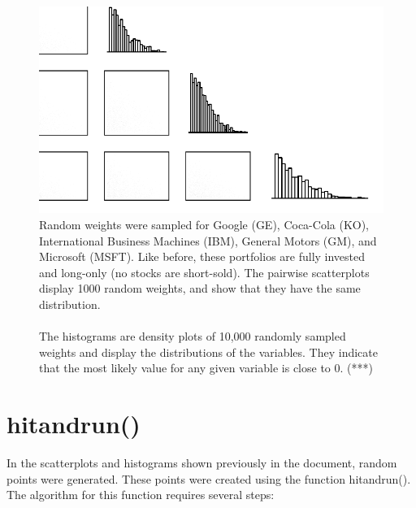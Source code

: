 \documentclass{article}\usepackage{graphicx, color}
\makeatletter
\def\maxwidth{ %
  \ifdim\Gin@nat@width>\linewidth
    \linewidth
  \else
    \Gin@nat@width
  \fi
}
\newenvironment{knitrout}{}{} %
\makeatother
\begin{document}
\begin{figure}[H]
\begin{knitrout}
\color{fgcolor}
\includegraphics[width=\maxwidth]{figure/fiveByFiveGrid} 

\end{knitrout}

\caption{Random weights were sampled for Google (GE), Coca-Cola (KO), International Business Machines (IBM), General Motors (GM), and Microsoft (MSFT). Like before, these portfolios are fully invested and long-only (no stocks are short-sold). The pairwise scatterplots display 1000 random weights, and show that they have the same distribution.
\\
\\
The histograms are density plots of 10,000 randomly sampled weights and display the distributions of the variables. They indicate that the most likely value for any given variable is close to 0. (***)}
\end{figure}

\section*{hitandrun()}

In the scatterplots and histograms shown previously in the document, random points were generated. These points were created using the function hitandrun(). The algorithm for this function requires several steps:
\end{document}
